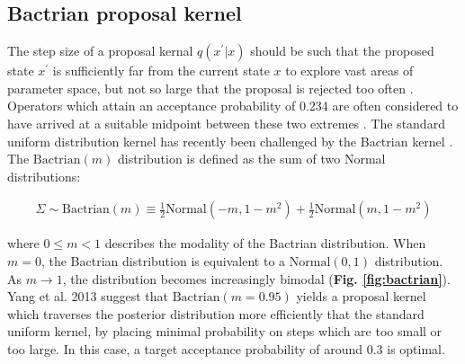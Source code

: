 \documentclass[10pt,letterpaper]{article}
\begin{document}









\clearpage
\subsection*{Bactrian proposal kernel} \label{sect:randomwalks}



The step size of a proposal kernal $q(x^\prime|x)$ should be such that the proposed state $x^\prime$ is sufficiently far from the current state $x$ to explore vast areas of parameter space, but not so large that the proposal is rejected too often \cite{roberts1997weak}. 
Operators which attain an acceptance probability of 0.234 are often considered to have arrived at a suitable midpoint between these two extremes \cite{bouckaert2019beast, roberts1997weak}.
The standard uniform distribution kernel has recently been challenged by the Bactrian kernel \cite{yang2013searching, thawornwattana2018designing}.
The $\text{Bactrian}(m)$ distribution is defined as the sum of two Normal distributions:


\begin{align}
	\Sigma \sim \text{Bactrian}(m) \equiv \frac{1}{2}\text{Normal}(-m, 1-m^2) + \frac{1}{2}\text{Normal}(m, 1-m^2)
\end{align}


where $0 \leq m < 1$ describes the modality of the Bactrian distribution. When $m=0$, the Bactrian distribution is equivalent to a $\text{Normal}(0, 1)$ distribution. As $m \rightarrow 1$, the distribution becomes increasingly bimodal (\textbf{Fig. \ref{fig:bactrian}}). 
Yang et al. 2013 \cite{yang2013searching} suggest that $\text{Bactrian}(m=0.95)$ yields a proposal kernel which traverses the posterior distribution more efficiently that the standard uniform kernel, by placing minimal probability on steps which are too small or too large.
In this case, a target acceptance probability of around 0.3 is optimal.
\end{document}
